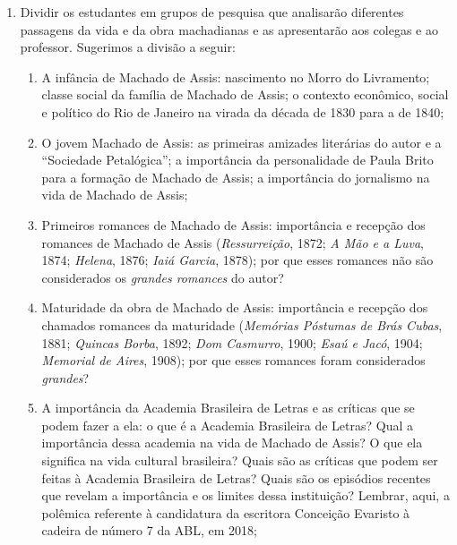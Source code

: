\documentclass{extarticle}
\begin{document}
\begin{enumerate}
\item Dividir os estudantes em grupos de pesquisa que analisarão diferentes
passagens da vida e da obra machadianas e as apresentarão aos colegas e
ao professor. Sugerimos a divisão a seguir:

\begin{enumerate}
\item A infância de Machado de Assis: nascimento no Morro do Livramento;
classe social da família de Machado de Assis; o contexto econômico,
social e político do Rio de Janeiro na virada da década de 1830 para a
de 1840;


\item O jovem Machado de Assis: as primeiras amizades literárias do autor e
a ``Sociedade Petalógica''; a importância da personalidade de Paula
Brito para a formação de Machado de Assis; a importância do jornalismo
na vida de Machado de Assis;


\item Primeiros romances de Machado de Assis: importância e recepção dos
romances de Machado de Assis (\emph{Ressurreição}, 1872; \emph{A Mão e a
Luva}, 1874; \emph{Helena}, 1876; \emph{Iaiá Garcia}, 1878); por que
esses romances não são considerados os \emph{grandes romances} do autor?

\item Maturidade da obra de Machado de Assis: importância e recepção dos
chamados romances da maturidade (\emph{Memórias Póstumas de Brás Cubas},
1881; \emph{Quincas Borba}, 1892; \emph{Dom Casmurro}, 1900; \emph{Esaú
e Jacó}, 1904; \emph{Memorial de Aires}, 1908); por que esses romances
foram considerados \emph{grandes}?

\item A importância da Academia Brasileira de Letras e as críticas que se
podem fazer a ela: o que é a Academia Brasileira de Letras? Qual a
importância dessa academia na vida de Machado de Assis? O que ela
significa na vida cultural brasileira? Quais são as críticas que podem
ser feitas à Academia Brasileira de Letras? Quais são os episódios
recentes que revelam a importância e os limites dessa instituição?
Lembrar, aqui, a polêmica referente à candidatura da escritora Conceição
Evaristo à cadeira de número 7 da ABL, em 2018;


\end{enumerate}
\end{enumerate}
\end{document}
